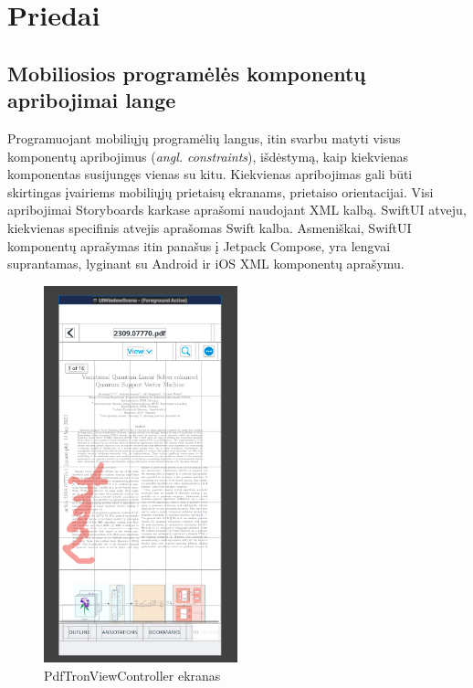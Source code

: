 
\setcounter{figure}{0}

\renewcommand{\thefigure}{\alph{figure}}

\section{Priedai}
\subsection{Mobiliosios programėlės komponentų apribojimai lange}
Programuojant mobiliųjų programėlių langus, itin svarbu matyti visus komponentų apribojimus (\emph{angl. constraints}), išdėstymą, kaip kiekvienas komponentas susijungęs vienas su kitu.
Kiekvienas apribojimas gali būti skirtingas įvairiems mobiliųjų prietaisų ekranams, prietaiso orientacijai. Visi apribojimai Storyboards karkase aprašomi naudojant XML kalbą. SwiftUI atveju, kiekvienas specifinis atvejis aprašomas Swift kalba. Asmeniškai, SwiftUI komponentų aprašymas itin panašus į Jetpack Compose, yra lengvai suprantamas, lyginant su Android ir iOS XML komponentų aprašymu.
\begin{figure}[htbp!]
    \centering
    \includegraphics[width=0.5\textwidth]{Images/PdfTronViewController.png}
    \caption{PdfTronViewController ekranas}
    \label{fig:pdfViewController screen}
\end{figure}
\newpage
